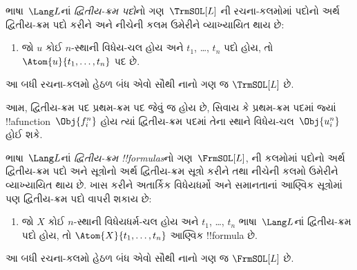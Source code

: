 \documentclass[../../../include/open-logic-section]{subfiles}
\begin{document}
\begin{defn}[દ્વિતીય-ક્રમ પદો]
ભાષા~$\Lang L$નાં \emph{દ્વિતીય-ક્રમ પદો}નો ગણ~$\TrmSOL[L]$
ની રચના-કલમોમાં પદોનો અર્થ
દ્વિતીય-ક્રમ પદો કરીને અને નીચેની કલમ ઉમેરીને વ્યાખ્યાયિત થાય છે:
\begin{enumerate}
\item જો $u$ કોઈ $n$-સ્થાની વિધેય-ચલ હોય અને $t_1$, \dots, $t_n$
  પદો હોય, તો $\Atom{u}{t_1, \ldots, t_n}$ પદ છે.
\end{enumerate}
આ બધી રચના-કલમો હેઠળ બંધ એવો સૌથી નાનો ગણ જ $\TrmSOL[L]$ છે.
\end{defn}

\begin{explain}
આમ, દ્વિતીય-ક્રમ પદ પ્રથમ-ક્રમ પદ જેવું જ હોય છે, સિવાય કે પ્રથમ-ક્રમ
પદમાં જ્યાં !!a{function}~$\Obj{f^n_i}$ હોય ત્યાં દ્વિતીય-ક્રમ પદમાં
તેના સ્થાને વિધેય-ચલ~$\Obj{u^n_i}$ હોઈ શકે.
\end{explain}

\begin{defn}
ભાષા~$\Lang L$નાં \emph{દ્વિતીય-ક્રમ !!{formula}s}નો
ગણ~$\FrmSOL[L]$, ની કલમોમાં
પદોનો અર્થ દ્વિતીય-ક્રમ પદો અને સૂત્રોનો અર્થ દ્વિતીય-ક્રમ સૂત્રો
કરીને તથા નીચેની કલમો ઉમેરીને વ્યાખ્યાયિત થાય છે. ખાસ કરીને
અતાર્કિક વિધેયધર્મો અને સમાનતાનાં આણ્વિક સૂત્રોમાં પણ દ્વિતીય-ક્રમ
પદો વાપરી શકાય છે:
\begin{enumerate}
\item જો $X$ કોઈ $n$-સ્થાની વિધેયધર્મ-ચલ હોય અને $t_1$, \dots,
  $t_n$ ભાષા~$\Lang L$નાં દ્વિતીય-ક્રમ પદો હોય, તો
  $\Atom{X}{t_1,\ldots, t_n}$ આણ્વિક !!{formula} છે.




\end{enumerate}
આ બધી રચના-કલમો હેઠળ બંધ એવો સૌથી નાનો ગણ જ $\FrmSOL[L]$ છે.
\end{defn}
\end{document}
